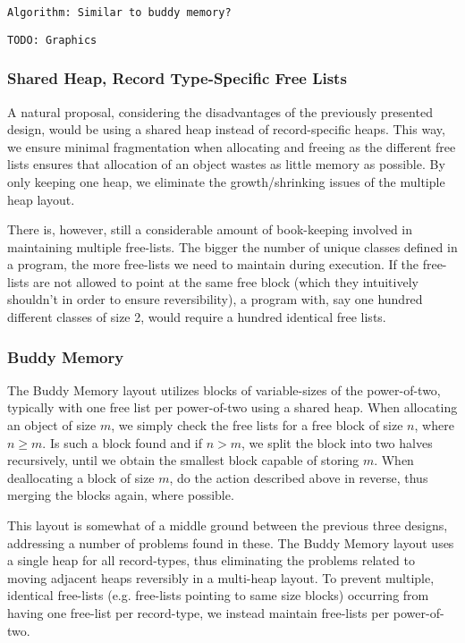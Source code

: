\texttt{Algorithm: Similar to buddy memory?}

\texttt{TODO: Graphics}

\subsubsection{Shared Heap, Record Type-Specific Free Lists}
A natural proposal, considering the disadvantages of the previously presented design, would be using a shared heap instead of record-specific heaps. 
This way, we ensure minimal fragmentation when allocating and freeing as the different free lists ensures that allocation of an object wastes as little memory as possible. By only keeping one heap, we eliminate the growth/shrinking issues of the multiple heap layout. 

There is, however, still a considerable amount of book-keeping involved in maintaining multiple free-lists. The bigger the number of unique classes defined in a program, the more free-lists we need to maintain during execution. If the free-lists are not allowed to point at the same free block (which they intuitively shouldn't in order to ensure reversibility), a program with, say one hundred different classes of size 2, would require a hundred identical free lists. 


\subsubsection{Buddy Memory}
\label{sec:buddy-memory}
The Buddy Memory layout utilizes blocks of variable-sizes of the power-of-two, typically with one free list per power-of-two using a shared heap. When allocating an object of size $m$, we simply check the free lists for a free block of size $n$, where $n \geq m$. Is such a block found and if $n > m$, we split the block into two halves recursively, until we obtain the smallest block capable of storing $m$. When deallocating a block of size $m$, do the action described above in reverse, thus merging the blocks again, where possible.

This layout is somewhat of a middle ground between the previous three designs, addressing a number of problems found in these. The Buddy Memory layout uses a single heap for all record-types, thus eliminating the problems related to moving adjacent heaps reversibly in a multi-heap layout. To prevent multiple, identical free-lists (e.g. free-lists pointing to same size blocks) occurring from having one free-list per record-type, we instead maintain free-lists per power-of-two.

